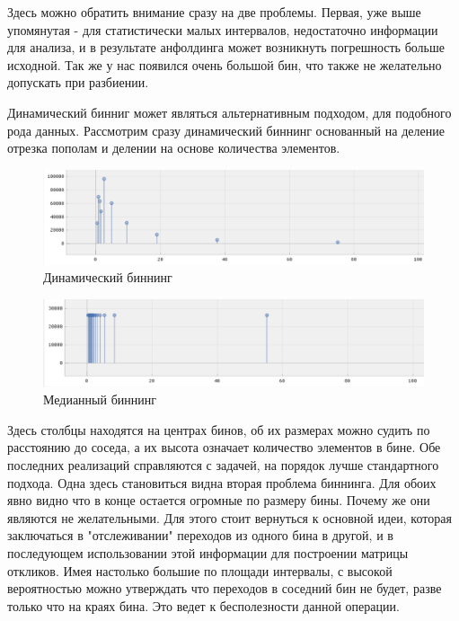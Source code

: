 \documentclass[a4paper,12pt]{diplom}
\begin{document}
Здесь можно обратить внимание сразу на две проблемы. Первая, уже выше упомянутая - для статистически малых интервалов, недостаточно информации 
для анализа, и в результате анфолдинга может возникнуть погрешность больше исходной. Так же у нас появился очень большой бин, что также не 
желательно допускать при разбиении.

Динамический бинниг может являться альтернативным подходом, для подобного рода данных. Рассмотрим сразу динамический биннинг основанный на 
деление отрезка пополам и делении на основе количества элементов.

 \begin{figure}[h!]
   \centering
   \includegraphics[width=\linewidth]{images/rig_dynamic_binning.png}
   \caption{Динамический биннинг}
 \end{figure}

 \begin{figure}[h!]
   \centering
   \includegraphics[width=\linewidth]{images/rig_median_binning.png}
   \caption{Медианный биннинг}
 \end{figure}
 

Здесь столбцы находятся на центрах бинов, об их размерах можно судить по расстоянию до соседа, а их высота означает количество элементов в бине. 
Обе последних реализаций справляются с задачей, на порядок лучше стандартного подхода. Одна здесь становиться видна вторая проблема биннинга.
Для обоих явно видно что в конце остается огромные по размеру бины. Почему же они являются не желательными. Для этого стоит вернуться к основной 
идеи, которая заключаться в "отслеживании" переходов из одного бина в другой, и в последующем использовании этой информации для построении матрицы 
откликов. Имея настолько большие по площади интервалы, с высокой вероятностью можно утверждать что переходов в соседний бин не будет, разве только
что на краях бина. Это ведет к бесполезности данной операции.
\end{document}
